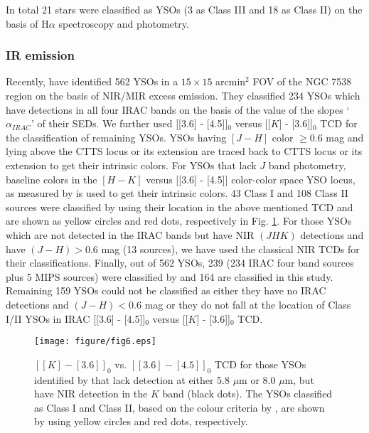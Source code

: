 \documentclass[a4paper,fleqn,usenatbib,useAMS]{mnras}
\begin{document}
In total 21 stars were classified as YSOs (3 as Class III and 18 as Class II) 
on the basis of H$\alpha$ spectroscopy and photometry. 

\subsubsection{IR emission}


Recently, \citet{2014MNRAS.439.3719C} have identified 562 YSOs in a $15 \times 15$ arcmin$^2$
FOV of the NGC 7538 region on the basis of NIR/MIR excess emission.
They classified 234 YSOs which have detections in all four IRAC bands
on the basis of the  value of the slopes `$\alpha_{IRAC}$' of their SEDs. 
We further used  [[3.6] - [4.5]]$_0$ versus [[$K$] - [3.6]]$_0$  TCD \citep[for details see,][]{2009ApJS..184...18G} 
for the classification of remaining YSOs.
YSOs having $[J-H]$ color $ \ge 0.6$ mag and lying above the
CTTS locus or its extension are traced back to CTTS locus or its extension to get their intrinsic colors.
For YSOs that lack $J$ band photometry, baseline colors in the
$[H - K]$ versus [[3.6] - [4.5]] color-color space YSO locus, as measured by \citet{2005ApJ...632..397G} is used
to get their intrinsic colors.
43 Class I  and  108 Class II  sources were classified by using their location 
in the above mentioned TCD and are shown as yellow circles and red dots, respectively in  Fig. \ref{IRAC}.
For those YSOs which are not detected in the IRAC bands  but have NIR $(JHK)$ detections and have $(J-H)>0.6$ mag (13 sources), we have used 
the classical NIR TCDs \citep[cf.][]{2004ApJ...616.1042O,2012PASJ...64..107S} for their classifications.
Finally, out of 562 YSOs, 239 (234 IRAC four band sources plus 5 MIPS sources) were classified by  \citet[][]{2014MNRAS.439.3719C}
and 164 are classified in this study.
Remaining 159 YSOs could not be classified as 
either they have  no IRAC detections and $(J-H)< 0.6$ mag
or they do not fall at the location of Class I/II YSOs in IRAC [[3.6] - [4.5]]$_0$ versus [[$K$] - [3.6]]$_0$ TCD.


\begin{figure}
\centering\texttt{[image: figure/fig6.eps]}
\caption{\label{IRAC}  ${[[K] - [3.6]]}_0$ vs. ${[[3.6] - [4.5]]}_0$ TCD 
for those YSOs identified by \citet{2014MNRAS.439.3719C} that lack detection at
either 5.8 $\mu$m or 8.0 $\mu$m, but have NIR detection in the $K$ band (black dots). 
The YSOs classified as Class I and Class II, based on the colour criteria by \citet{2009ApJS..184...18G}, 
are shown by using yellow circles  and  red dots, respectively.
 }
\end{figure}
\end{document}
